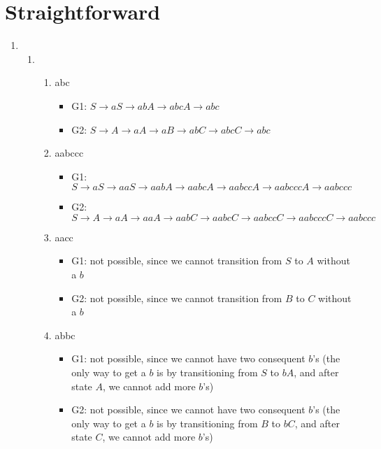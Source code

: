 \documentclass[a4paper]{article}
\begin{document}
\section{Straightforward}
    \begin{enumerate}
        \item \begin{enumerate}
            \item \begin{enumerate}
                \item abc
                \begin{itemize}
                    \item G1: $S \rightarrow aS \rightarrow abA \rightarrow abcA \rightarrow abc$
                    \item G2: $S \rightarrow A \rightarrow aA \rightarrow aB \rightarrow abC \rightarrow abcC \rightarrow abc$ \\
                \end{itemize}
                
                \item aabccc
                \begin{itemize}
                    \item G1: $S \rightarrow aS \rightarrow aaS \rightarrow aabA \rightarrow aabcA \rightarrow aabccA \rightarrow aabcccA \rightarrow aabccc$
                    \item G2: $S \rightarrow A \rightarrow aA \rightarrow aaA \rightarrow aabC \rightarrow aabcC \rightarrow aabccC \rightarrow aabcccC \rightarrow aabccc$ \\
                \end{itemize}

                \item aacc
                \begin{itemize}
                    \item G1: not possible, since we cannot transition from $S$ to $A$ without a $b$
                    \item G2: not possible, since we cannot transition from $B$ to $C$ without a $b$ \\
                \end{itemize}

                \item abbc
                \begin{itemize}
                    \item G1: not possible, since we cannot have two consequent $b$'s (the only way to get a $b$ is by transitioning from $S$ to $bA$, and after state $A$, we cannot add more $b$'s)
                    \item G2: not possible, since we cannot have two consequent $b$'s (the only way to get a $b$ is by transitioning from $B$ to $bC$, and after state $C$, we cannot add more $b$'s) \\ \\
                \end{itemize}
            \end{enumerate}


\end{enumerate}
\end{enumerate}
\end{document}
